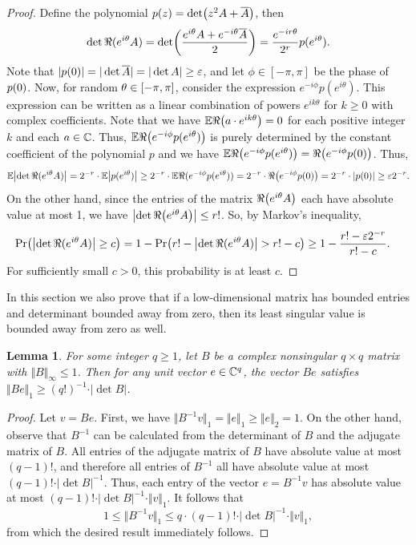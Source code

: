 \documentclass{daj}
\theoremstyle{plain}
\theoremstyle{plain}
\newtheorem{lem}[thm]{Lemma}
\theoremstyle{plain}
\theoremstyle{plain}
\theoremstyle{definition}
\theoremstyle{plain}
\theoremstyle{plain}
\theoremstyle{definition}
\theoremstyle{definition}
\theoremstyle{plain}
\let\originalleft\left
\let\originalright\right
\renewcommand{\left}{\mathopen{}\mathclose\bgroup\originalleft}
\renewcommand{\right}{\aftergroup\egroup\originalright}
\begin{document}
\begin{proof}
Define the polynomial $p(z)=\det\left(z^{2}A+\overline{A}\right)$,
then
\[
\det \Re(e^{i\theta}A)=\det\left(\frac{e^{i\theta}A+e^{-i\theta}\overline{A}}{2}\right)=\frac{e^{-ir\theta}}{2^r}p(e^{i\theta}).
\]
Note that $\vert p(0)\vert=\vert \det\overline{A}\vert=\vert \det A\vert\geq \varepsilon$, and let $\phi\in [-\pi,\pi]$ be the phase of $p\left(0\right)$. Now, for random $\theta\in\left[-\pi,\pi\right]$, consider the expression $e^{-i\phi}p(e^{i\theta})$. This expression can be written as a linear combination of powers $e^{ik\theta}$ for $k\geq 0$ with  complex coefficients. Note that  we have $\E\Re\left(a\cdot e^{ik\theta}\right)=0$ for each positive integer $k$ and each $a\in \mathbb{C}$. Thus, $\E\Re\left(e^{-i\phi}p(e^{i\theta})\right)$ is purely determined by the constant coefficient of the polynomial $p$ and we have $\E\Re\left(e^{-i\phi}p(e^{i\theta})\right)=\Re\left(e^{-i\phi}p\left(0\right)\right)$. Thus,
\[
\E\left|\det \Re(e^{i\theta}A)\right|=2^{-r}\cdot \E\left|p(e^{i\theta})\right|\ge2^{-r}\cdot \E\Re(e^{-i\phi}p(e^{i\theta}))=2^{-r}\cdot \Re\left(e^{-i\phi}p\left(0\right)\right)=2^{-r}\cdot \vert p(0)\vert\ge\varepsilon2^{-r}.
\]
On the other hand, since the entries of the matrix $\Re\left(e^{i\theta}A\right)$
each have absolute value at most 1, we have $\left|\det\Re\left(e^{i\theta}A\right)\right|\le r!$.
So, by Markov's inequality,
\begin{align*}
\Pr\left(\left|\det \Re(e^{i\theta}A)\right|\ge c\right) & =1-\Pr\left(r!-\left|\det\Re(e^{i\theta}A)\right|> r!-c\right)\ge1-\frac{r!-\varepsilon2^{-r}}{r!-c}.
\end{align*}
For sufficiently small $c>0$, this probability is at least $c$.
\end{proof}

In this section we also prove that if a low-dimensional matrix has bounded entries and determinant bounded away from zero, then its least singular value is bounded away from zero as well.

\begin{lem}\label{lem-Be-large}
For some integer $q\geq 1$, let $B$ be a complex nonsingular $q\times q$ matrix with $\Vert B\Vert_\infty\le 1$. Then for any unit vector $e\in \mathbb{C}^q$, the vector $Be$ satisfies $\Vert Be\Vert_1\geq (q!)^{-1}\cdot \vert \det B\vert$.
\end{lem}
\begin{proof}
Let $v=Be$. First, we have $\Vert B^{-1}v\Vert_1=\Vert e\Vert_1\ge \Vert e\Vert_2=1$. On the other hand, observe that $B^{-1}$ can be calculated from the determinant of $B$ and the adjugate matrix of $B$. All entries of the adjugate matrix of $B$ have absolute value at most $(q-1)!$, and therefore all entries of $B^{-1}$ all have absolute value at most $(q-1)!\cdot \vert \det B\vert^{-1}$. Thus, each entry of the vector $e=B^{-1}v$ has absolute value at most $(q-1)!\cdot\vert \det B\vert^{-1}\cdot\Vert v\Vert_1$. It follows that
\[1\le \Vert B^{-1}v\Vert_1\leq q\cdot (q-1)!\cdot\vert \det B\vert^{-1}\cdot \Vert v\Vert_1,\]
from which the desired result immediately follows.
\end{proof}
\end{document}
